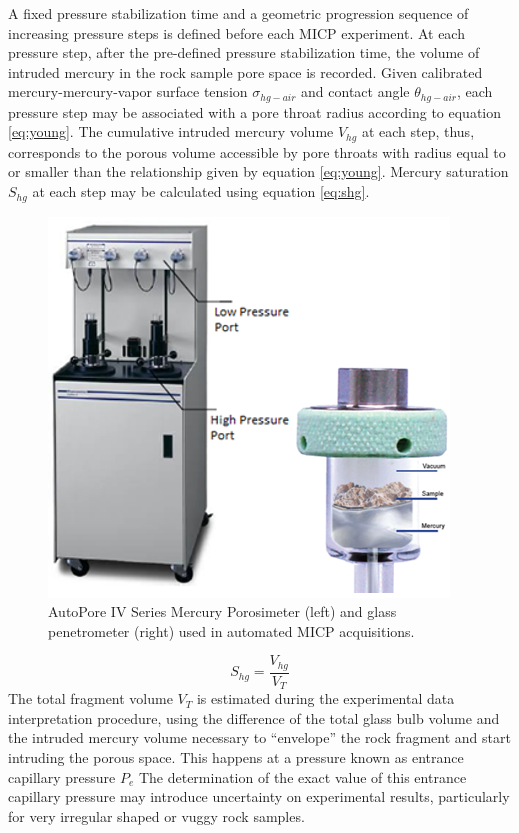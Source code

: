 \documentclass[english,msc,numbers]{coppe}
\begin{document}
  A fixed pressure stabilization time and a geometric progression sequence of increasing pressure steps is defined before each MICP experiment. At each pressure step, after the pre-defined pressure stabilization time, the volume of intruded mercury in the rock sample pore space is recorded. Given calibrated mercury-mercury-vapor surface tension \(\sigma_{hg-air}\) and contact angle \(\theta_{hg-air}\), each pressure step may be associated with a pore throat radius according to equation \eqref{eq:young}. The cumulative intruded mercury volume \(V_{hg}\) at each step, thus, corresponds to the porous volume accessible by pore throats with radius equal to or smaller than the relationship given by equation \eqref{eq:young}. Mercury saturation \(S_{hg}\) at each step may be calculated using equation \eqref{eq:shg}.
  \begin{figure}
  
  {\centering \includegraphics[width=0.5\linewidth]{figure/2-3-Autopore} 
  
  }
  
  \caption{AutoPore IV Series Mercury Porosimeter (left) and glass penetrometer (right) used in automated MICP acquisitions.}\label{fig:autopore}
  \end{figure}
  \begin{equation} 
    S_{hg} = \frac{V_{hg}}{V_T}
    \label{eq:shg}
  \end{equation}
  The total fragment volume \(V_T\) is estimated during the experimental data interpretation procedure, using the difference of the total glass bulb volume and the intruded mercury volume necessary to ``envelope'' the rock fragment and start intruding the porous space. This happens at a pressure known as entrance capillary pressure \(P_e\) The determination of the exact value of this entrance capillary pressure may introduce uncertainty on experimental results, particularly for very irregular shaped or vuggy rock samples.
  
\end{document}
